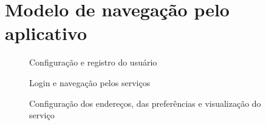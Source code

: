 \chapter{Modelo de navegação pelo aplicativo}

\begin{figure}[h]
  \center
  \qquad
  \caption[Configuração e registro do usuário]{Configuração e registro do usuário}
\end{figure}
\begin{figure}[h]
  \qquad
  \qquad
  \caption[Login e navegação pelos serviços]{Login e navegação pelos serviços}
\end{figure}
\begin{figure}[h]
  \qquad
  \qquad
  \qquad
  \caption[Configuração dos endereços, das preferências e visualização do serviço]{Configuração dos endereços, das preferências e visualização do serviço}
\end{figure}